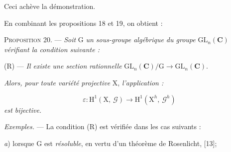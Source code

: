 \begin{center}
\end{center}
Ceci achève la démonstration.

En combinant les propositions 18 et 19, on obtient :

\textsc{Proposition} 20. --- \textit{Soit} $\mathrm{G}$ \textit{un sous-groupe algébrique du groupe} $\mathrm{GL}_n(\mathbf{C})$ \textit{vérifiant la condition suivante :}

(R) --- \textit{Il existe une section rationnelle} $\mathrm{GL}_n(\mathbf{C})/\mathrm{G} \to \mathrm{GL}_n(\mathbf{C})$.



\textit{Alors, pour toute variété projective} $\mathrm{X}$, \textit{l'application :}

\begin{equation*}
\varepsilon : \mathrm{H}^1(\mathrm{X},\ \mathcal{G}) \to \mathrm{H}^1(\mathrm{X}^h,\ \mathcal{G}^h)
\end{equation*}
\textit{est bijective.}

\textit{Exemples.} --- La condition (R) est vérifiée dans les cas suivants :

\textit{a}) lorsque $\mathrm{G}$ est \textit{résoluble}, en vertu d'un théorème de Rosenlicht, [13];

